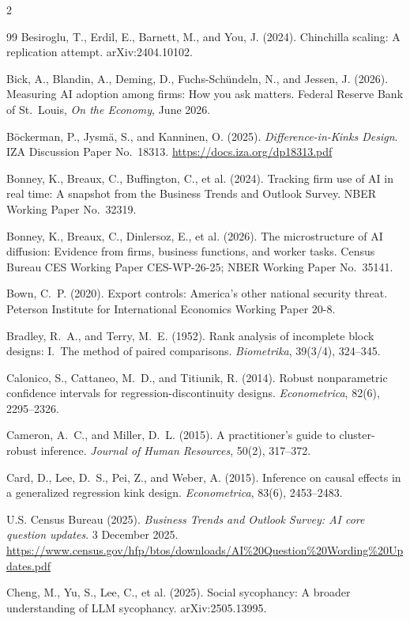 \documentclass[11pt]{article}
\begin{document}
\begin{multicols}{2}
\begin{thebibliography}{99}
Besiroglu, T., Erdil, E., Barnett, M., and You, J. (2024).
Chinchilla scaling: A replication attempt.
arXiv:2404.10102.

Bick, A., Blandin, A., Deming, D., Fuchs-Sch\"undeln, N., and Jessen, J.
(2026).
Measuring AI adoption among firms: How you ask matters.
Federal Reserve Bank of St.\ Louis, \emph{On the Economy}, June 2026.

B\"ockerman, P., Jysm\"a, S., and Kanninen, O. (2025).
\emph{Difference-in-Kinks Design}.
IZA Discussion Paper No.~18313.
\url{https://docs.iza.org/dp18313.pdf}

Bonney, K., Breaux, C., Buffington, C., et al. (2024).
Tracking firm use of AI in real time: A snapshot from the Business Trends and
Outlook Survey.
NBER Working Paper No.~32319.

Bonney, K., Breaux, C., Dinlersoz, E., et al. (2026).
The microstructure of AI diffusion: Evidence from firms, business functions,
and worker tasks.
Census Bureau CES Working Paper CES-WP-26-25; NBER Working Paper No.~35141.

Bown, C.~P. (2020).
Export controls: America's other national security threat.
Peterson Institute for International Economics Working Paper 20-8.

Bradley, R.~A., and Terry, M.~E. (1952).
Rank analysis of incomplete block designs: I.\ The method of paired
comparisons.
\emph{Biometrika}, 39(3/4), 324--345.

Calonico, S., Cattaneo, M.~D., and Titiunik, R. (2014).
Robust nonparametric confidence intervals for regression-discontinuity
designs.
\emph{Econometrica}, 82(6), 2295--2326.

Cameron, A.~C., and Miller, D.~L. (2015).
A practitioner's guide to cluster-robust inference.
\emph{Journal of Human Resources}, 50(2), 317--372.

Card, D., Lee, D.~S., Pei, Z., and Weber, A. (2015).
Inference on causal effects in a generalized regression kink design.
\emph{Econometrica}, 83(6), 2453--2483.

U.S. Census Bureau (2025).
\emph{Business Trends and Outlook Survey: AI core question updates}.
3 December 2025.
\url{https://www.census.gov/hfp/btos/downloads/AI\%20Question\%20Wording\%20Updates.pdf}

Cheng, M., Yu, S., Lee, C., et al. (2025).
Social sycophancy: A broader understanding of LLM sycophancy.
arXiv:2505.13995.


\end{thebibliography}
\end{multicols}
\end{document}
